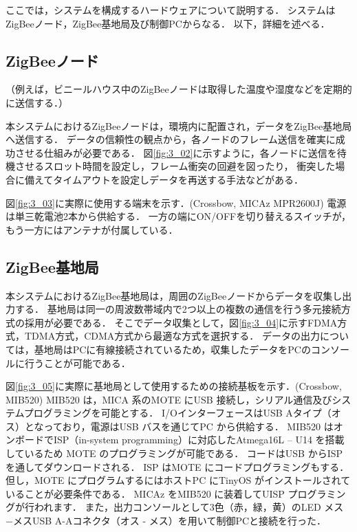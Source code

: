 \documentclass[12pt]{jreport}
\begin{document}
ここでは，システムを構成するハードウェアについて説明する．
システムはZigBeeノード，ZigBee基地局及び制御PCからなる．
以下，詳細を述べる．

\subsection{ZigBeeノード}

（例えば，ビニールハウス中のZigBeeノードは取得した温度や湿度などを定期的に送信する．）

本システムにおけるZigBeeノードは，環境内に配置され，データをZigBee基地局へ送信する．
データの信頼性の観点から，各ノードのフレーム送信を確実に成功させる仕組みが必要である．
図\ref{fig:3_02}に示すように，各ノードに送信を待機させるスロット時間を設定し，フレーム衝突の回避を図ったり，
衝突した場合に備えてタイムアウトを設定しデータを再送する手法などがある．

図\ref{fig:3_03}に実際に使用する端末を示す．(Crossbow, MICAz MPR2600J)
電源は単三乾電池2本から供給する．
一方の端にON/OFFを切り替えるスイッチが，もう一方にはアンテナが付属している．

\subsection{ZigBee基地局}

本システムにおけるZigBee基地局は，周囲のZigBeeノードからデータを収集し出力する．
基地局は同一の周波数帯域内で2つ以上の複数の通信を行う多元接続方式の採用が必要である．
そこでデータ収集として，図\ref{fig:3_04}に示すFDMA方式，TDMA方式，CDMA方式から最適な方式を選択する．
データの出力については，基地局はPCに有線接続されているため，収集したデータをPCのコンソールに行うことが可能である．

図\ref{fig:3_05}に実際に基地局として使用するための接続基板を示す．(Crossbow, MIB520)
MIB520 は，MICA 系のMOTE にUSB 接続し，シリアル通信及びシステムプログラミングを可能とする．
I/OインターフェースはUSB Aタイプ（オス）となっており，電源はUSB バスを通じてPC から供給する．
MIB520 はオンボードでISP（in-system programming）に対応したAtmega16L – U14 を搭載しているため
MOTE のプログラミングが可能である．
コードはUSB からISP を通してダウンロードされる．
ISP はMOTE にコードプログラミングもする．
但し，MOTE にプログラムするにはホストPC にTinyOS がインストールされていることが必要条件である．
MICAz をMIB520 に装着してUISP プログラミングが行われます．
また，出力コンソールとして3色（赤，緑，黄）のLED
メス−メスUSB A-Aコネクタ（オス - メス）を用いて制御PCと接続を行った．
\end{document}
